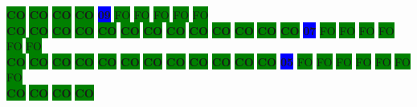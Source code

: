 \colorbox{green}{\color[rgb]{0,0,0}\textbf{CO}}%
\colorbox{green}{\color[rgb]{0,0,0}\textbf{CO}}%
\colorbox{green}{\color[rgb]{0,0,0}\textbf{CO}}%
\colorbox{green}{\color[rgb]{0,0,0}\textbf{CO}}%
\colorbox{blue}{\color[rgb]{1,0,0}\textbf{09}}%
\colorbox{green}{\color[gray]{0.75}FO}%
\colorbox{green}{\color[gray]{0.75}FO}%
\colorbox{green}{\color[gray]{0.75}FO}%
\colorbox{green}{\color[gray]{0.75}FO}%
\colorbox{green}{\color[gray]{0.75}FO}%
\\
\colorbox{green}{\color[rgb]{0,0,0}\textbf{CO}}%
\colorbox{green}{\color[rgb]{0,0,0}\textbf{CO}}%
\colorbox{green}{\color[rgb]{0,0,0}\textbf{CO}}%
\colorbox{green}{\color[rgb]{0,0,0}\textbf{CO}}%
\colorbox{green}{\color[rgb]{0,0,0}\textbf{CO}}%
\colorbox{green}{\color[rgb]{0,0,0}\textbf{CO}}%
\colorbox{green}{\color[rgb]{0,0,0}\textbf{CO}}%
\colorbox{green}{\color[rgb]{0,0,0}\textbf{CO}}%
\colorbox{green}{\color[rgb]{0,0,0}\textbf{CO}}%
\colorbox{green}{\color[rgb]{0,0,0}\textbf{CO}}%
\colorbox{green}{\color[rgb]{0,0,0}\textbf{CO}}%
\colorbox{green}{\color[rgb]{0,0,0}\textbf{CO}}%
\colorbox{green}{\color[rgb]{0,0,0}\textbf{CO}}%
\colorbox{blue}{\color[rgb]{1,0,0}\textbf{07}}%
\colorbox{green}{\color[gray]{0.75}FO}%
\colorbox{green}{\color[gray]{0.75}FO}%
\colorbox{green}{\color[gray]{0.75}FO}%
\colorbox{green}{\color[gray]{0.75}FO}%
\colorbox{green}{\color[gray]{0.75}FO}%
\colorbox{green}{\color[gray]{0.75}FO}%
\\
\colorbox{green}{\color[rgb]{0,0,0}\textbf{CO}}%
\colorbox{green}{\color[rgb]{0,0,0}\textbf{CO}}%
\colorbox{green}{\color[rgb]{0,0,0}\textbf{CO}}%
\colorbox{green}{\color[rgb]{0,0,0}\textbf{CO}}%
\colorbox{green}{\color[rgb]{0,0,0}\textbf{CO}}%
\colorbox{green}{\color[rgb]{0,0,0}\textbf{CO}}%
\colorbox{green}{\color[rgb]{0,0,0}\textbf{CO}}%
\colorbox{green}{\color[rgb]{0,0,0}\textbf{CO}}%
\colorbox{green}{\color[rgb]{0,0,0}\textbf{CO}}%
\colorbox{green}{\color[rgb]{0,0,0}\textbf{CO}}%
\colorbox{green}{\color[rgb]{0,0,0}\textbf{CO}}%
\colorbox{green}{\color[rgb]{0,0,0}\textbf{CO}}%
\colorbox{blue}{\color[rgb]{1,0,0}\textbf{05}}%
\colorbox{green}{\color[gray]{0.75}FO}%
\colorbox{green}{\color[gray]{0.75}FO}%
\colorbox{green}{\color[gray]{0.75}FO}%
\colorbox{green}{\color[gray]{0.75}FO}%
\colorbox{green}{\color[gray]{0.75}FO}%
\colorbox{green}{\color[gray]{0.75}FO}%
\colorbox{green}{\color[gray]{0.75}FO}%
\\
\colorbox{green}{\color[rgb]{0,0,0}\textbf{CO}}%
\colorbox{green}{\color[rgb]{0,0,0}\textbf{CO}}%
\colorbox{green}{\color[rgb]{0,0,0}\textbf{CO}}%
\colorbox{green}{\color[rgb]{0,0,0}\textbf{CO}}%

